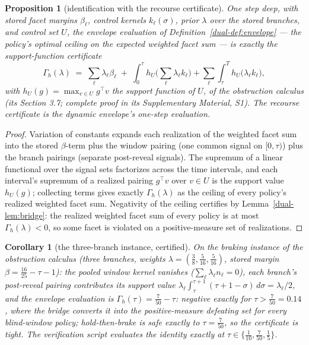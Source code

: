 \documentclass[10pt,twocolumn]{article}
\theoremstyle{plain}
\newtheorem{proposition}[theorem]{Proposition}
\newtheorem{corollary}[theorem]{Corollary}
\theoremstyle{definition}
\theoremstyle{remark}
\begin{document}
\begin{proposition}[identification with the recourse certificate]
\label{dual-prop:recourse-id}
One step deep, with stored facet margins $\beta_{\ell}$, control kernels
$k_{\ell}(\sigma)$, prior $\lambda$ over the stored branches, and control
set $U$, the envelope evaluation of
Definition~\ref{dual-def:envelope} --- the policy's optimal ceiling on the
expected weighted facet sum --- is exactly the support-function certificate
\[
\Gamma_{h}(\lambda) \;=\; \sum_{\ell} \lambda_{\ell} \beta_{\ell}
\;+\; \int_{0}^{\tau} h_{U}\Big(\sum_{\ell} \lambda_{\ell} k_{\ell}\Big)
+ \sum_{\ell} \int_{\tau}^{T} h_{U}\big(\lambda_{\ell} k_{\ell}\big),
\]
with $h_{U}(g) = \max_{v \in U} g^{\top} v$ the support function of $U$,
of the obstruction calculus (its Section 3.7; complete proof in its
Supplementary Material, S1). The recourse certificate is the dynamic
envelope's one-step evaluation.
\end{proposition}
\begin{proof}
Variation of constants expands each realization of the weighted facet sum
into the stored $\beta$-term plus the window pairing (one common signal on
$[0, \tau)$) plus the branch pairings (separate post-reveal signals). The
supremum of a linear functional over the signal sets factorizes across the
time intervals, and each interval's supremum of a realized pairing
$g^{\top} v$ over $v \in U$ is the support value $h_{U}(g)$; collecting
terms gives exactly $\Gamma_{h}(\lambda)$ as the ceiling of every policy's
realized weighted facet sum. Negativity of the ceiling certifies by
Lemma~\ref{dual-lem:bridge}: the realized weighted facet sum of every policy is
at most $\Gamma_{h}(\lambda) < 0$, so some facet is violated on a
positive-measure set of realizations.
\end{proof}

\begin{corollary}[the three-branch instance, certified]\label{dual-cor:three-branch}
On the braking instance of the obstruction calculus (three branches,
weights $\lambda = (\tfrac{3}{8}, \tfrac{5}{16}, \tfrac{5}{16})$, stored
margin $\beta = \tfrac{16}{25} - \tau - 1$): the pooled window kernel
vanishes ($\sum_{\ell} \lambda_{\ell} n_{\ell} = 0$), each branch's
post-reveal pairing contributes its support value
$\lambda_{\ell} \int_{\tau}^{\tau+1} (\tau + 1 - \sigma)\, d\sigma =
\lambda_{\ell}/2$, and the envelope evaluation is
$\Gamma_{h}(\tau) = \tfrac{7}{50} - \tau$: negative exactly for
$\tau > \tfrac{7}{50} = 0.14$, where the bridge converts it into the
positive-measure defeating set for every blind-window policy;
hold-then-brake is safe exactly to $\tau = \tfrac{7}{50}$, so the
certificate is tight. The verification script evaluates the identity
exactly at $\tau \in \{\tfrac{1}{10}, \tfrac{7}{50}, \tfrac{1}{5}\}$.
\end{corollary}
\end{document}
